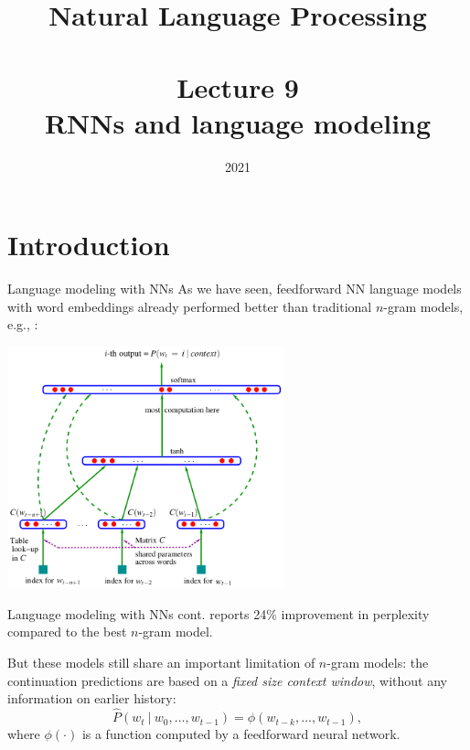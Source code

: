 \documentclass[style=upen, size=14pt]{powerdot}
\theoremstyle{definition}
\begin{document}
\title{Natural Language Processing\\~~\\Lecture 9\\RNNs and language modeling}

\date{2021}
\maketitle


\section[toc=Introduction]{Introduction}

\begin{slide}[toc=NN-based LMs]{Language modeling with NNs}
  As we have seen, feedforward NN language models with word embeddings already
  performed better than traditional $n$-gram models, e.g.,
  \cite{bengio2003neural}:
  \begin{center}
    \includegraphics[width=0.6\textwidth]{figures/neural_lm.eps}
  \end{center}
\end{slide}

\begin{slide}[toc=]{Language modeling with NNs cont.}
  \cite{bengio2003neural} reports 24\% improvement in perplexity compared to the
  best $n$-gram model.\bigskip
  
  But these models still share an important limitation of $n$-gram models: the
  continuation predictions are based on a \emph{fixed size context window},
  without any information on earlier history:
  $$
  \hat P(w_{t}~|~w_0,\dots,w_{t-1}) = \phi(w_{t-k},\dots, w_{t-1}),
  $$
  where $\phi(\cdot)$ is a function computed by a feedforward neural network.
\end{slide}
\end{document}
